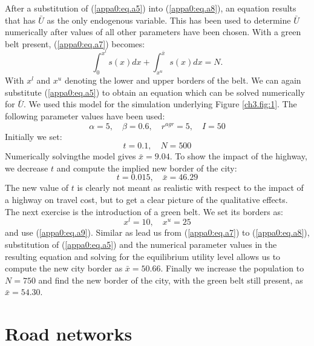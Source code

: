 \documentclass[a4paper,authoryear,review]{elsarticle}  	%
\begin{document}
	After a substitution of (\ref{appa0:eq.a5}) into (\ref{appa0:eq.a8}), an equation results that has $\bar{U}$ as the only endogenous variable. This has been used to determine $\bar{U}$ numerically after values of all other parameters have been chosen. 
	With a green belt present, (\ref{appa0:eq.a7}) becomes:
	\begin{equation}\label{appa0:eq.a9}
		\int_{0}^{x^l}{s(x)}dx + \int_{x^u}^{\bar{x}}{s(x)}dx = N.
	\end{equation}
	With $x^l$ and $x^u$ denoting the lower and upper borders of the belt. We can again substitute (\ref{appa0:eq.a5}) to obtain an equation which can be solved numerically for $\bar{U}$.
	We used this model for the simulation underlying Figure \ref{ch3.fig:1}. The following parameter values have been used:
	\begin{equation}\label{appa0:eq.a10}
		\alpha = 5, \quad  \beta = 0.6, \quad r^{agr} = 5, \quad I = 50
	\end{equation}
	Initially we set:
	\begin{equation}\label{appa0:eq.a11}
		t = 0.1, \quad N = 500
	\end{equation}
	Numerically solvingthe model gives $\bar{x} = 9.04$. To show the impact of the highway, we decrease $t$ and compute the implied new border of the city:
	\begin{equation}\label{appa0:eq.a12}
		t = 0.015, \quad \bar{x} = 46.29
	\end{equation}
	The new value of $t$ is clearly not meant as realistic with respect to the impact of a highway on travel cost, but to get a clear picture of the qualitative effects.\\
	The next exercise is the introduction of a green belt. We set its borders as:
	\begin{equation}\label{appa0:eq.a13}
		x^l = 10, \quad x^u = 25
	\end{equation}
	and use (\ref{appa0:eq.a9}). Similar as lead us from (\ref{appa0:eq.a7}) to (\ref{appa0:eq.a8}), substitution of (\ref{appa0:eq.a5}) and the numerical parameter values in the resulting equation and solving for the equilibrium utility level allows us to compute the new city border as $\bar{x} = 50.66$. Finally we increase the population to $N = 750$ and find the new border of the city, with the green belt still present, as $\bar{x} = 54.30$.

\newpage	
\section[Appendix B]{Road networks}\label{appa}
\end{document}
